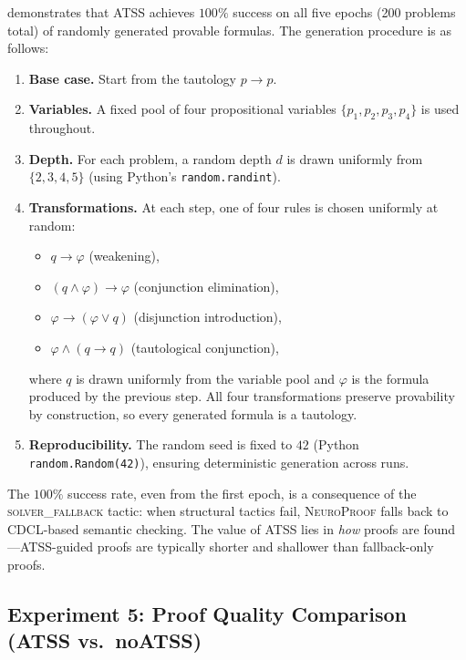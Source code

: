 \documentclass[conference]{IEEEtran}
\newcommand{\NP}{\textsc{NeuroProof}}
\newcommand{\ATSS}{\textsc{ATSS}}
\begin{document}
 demonstrates that \ATSS{} achieves
$100\%$ success on all five epochs (200 problems total) of randomly
generated provable formulas.  The generation procedure is as follows:
\begin{enumerate}
  \item \textbf{Base case.}  Start from the tautology $p \to p$.
  \item \textbf{Variables.}  A fixed pool of four propositional variables
    $\{p_1, p_2, p_3, p_4\}$ is used throughout.
  \item \textbf{Depth.}  For each problem, a random depth $d$ is drawn
    uniformly from $\{2, 3, 4, 5\}$ (using Python's
    \texttt{random.randint}).
  \item \textbf{Transformations.}  At each step, one of four rules is
    chosen uniformly at random:
    \begin{itemize}
      \item $q \to \varphi$ \quad (weakening),
      \item $(q \wedge \varphi) \to \varphi$ \quad (conjunction elimination),
      \item $\varphi \to (\varphi \vee q)$ \quad (disjunction introduction),
      \item $\varphi \wedge (q \to q)$ \quad (tautological conjunction),
    \end{itemize}
    where $q$ is drawn uniformly from the variable pool and $\varphi$
    is the formula produced by the previous step.  All four
    transformations preserve provability by construction, so every
    generated formula is a tautology.
  \item \textbf{Reproducibility.}  The random seed is fixed to $42$
    (Python \texttt{random.Random(42)}), ensuring deterministic
    generation across runs.
\end{enumerate}

The $100\%$ success rate, even from the first epoch, is a
consequence of the \textsc{solver\_fallback} tactic: when
structural tactics fail, \NP{} falls back to CDCL-based semantic
checking.  The value of ATSS lies in \emph{how} proofs are
found---ATSS-guided proofs are typically shorter and shallower
than fallback-only proofs.

\subsection{Experiment 5: Proof Quality Comparison \textnormal{(ATSS vs.\ noATSS)}}
\label{sec:exp-quality}
\end{document}
